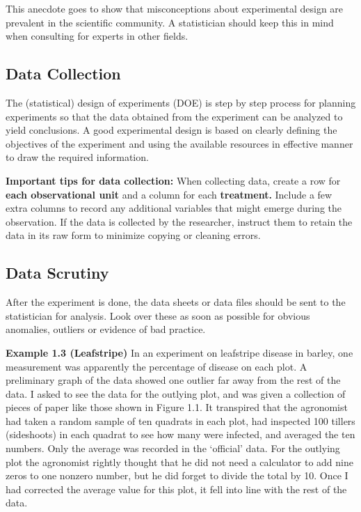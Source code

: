 \documentclass{tufte-book}
\begin{document}
This anecdote goes to show that misconceptions about experimental design are prevalent in the scientific community. 
A statistician should keep this in mind when consulting for experts in other fields. \newline

\subsection{Data Collection}

The (statistical) design of experiments (DOE) is step by step process for planning experiments so that the data obtained 
from the experiment can be analyzed to yield  conclusions. A good experimental design is based on clearly defining the 
objectives of the experiment and using the available resources in effective manner to draw the required information. \newline

\textbf{Important tips for data collection:}
When collecting data, create a row for \textbf{each observational unit} and a column for each \textbf{treatment.} Include 
a few extra columns to record any additional variables that might emerge during the observation. If the data is collected 
by the researcher, instruct them to retain the data in its raw form to minimize copying or cleaning errors.

\subsection{Data Scrutiny}

After the experiment is done, the data sheets or data files should be sent to the statistician
for analysis. Look over these as soon as possible for obvious anomalies, outliers or evidence
of bad practice. \newline

\textbf{Example 1.3 (Leafstripe)} In an experiment on leafstripe disease in barley, one measurement
was apparently the percentage of disease on each plot. A preliminary graph of the data showed
one outlier far away from the rest of the data. I asked to see the data for the outlying plot, and
was given a collection of pieces of paper like those shown in Figure 1.1. It transpired that the
agronomist had taken a random sample of ten quadrats in each plot, had inspected 100 tillers
(sideshoots) in each quadrat to see how many were infected, and averaged the ten numbers.
Only the average was recorded in the ‘official’ data. For the outlying plot the agronomist
rightly thought that he did not need a calculator to add nine zeros to one nonzero number, but
he did forget to divide the total by 10. Once I had corrected the average value for this plot, it
fell into line with the rest of the data. \newline
\end{document}
